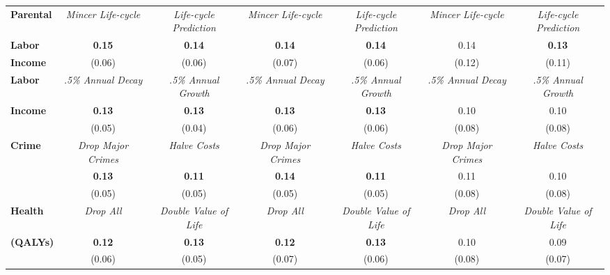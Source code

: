 \begin{tabular}{>{\bfseries}lcc|cc|cc}
Parental	&	\textit{Mincer Life-cycle}	&	\textit{Life-cycle Prediction}	&	\textit{Mincer Life-cycle}	&	\textit{Life-cycle Prediction}	&	\textit{Mincer Life-cycle}	&	\textit{Life-cycle Prediction}	\\
Labor	&	\textbf{0.15}	&	\textbf{0.14}	&	\textbf{0.14}	&	\textbf{0.14}	&	0.14	&	\textbf{0.13}	\\
Income	&	(0.06)	&	(0.06)	&	(0.07)	&	(0.06)	&	(0.12)	&	(0.11)	\\ \midrule
Labor	&	\textit{.5\% Annual Decay}	&	\textit{.5\% Annual Growth}	&	\textit{.5\% Annual Decay}	&	\textit{.5\% Annual Growth}	&	\textit{.5\% Annual Decay}	&	\textit{.5\% Annual Growth}	\\
Income	&	\textbf{0.13}	&	\textbf{0.13}	&	\textbf{0.13}	&	\textbf{0.13}	&	0.10	&	0.10	\\
	&	(0.05)	&	(0.04)	&	(0.06)	&	(0.06)	&	(0.08)	&	(0.08)	\\ \midrule
Crime	&	\textit{Drop Major Crimes}	&	\textit{Halve Costs}	&	\textit{Drop Major Crimes}	&	\textit{Halve Costs}	&	\textit{Drop Major Crimes}	&	\textit{Halve Costs}	\\
	&	\textbf{0.13}	&	\textbf{0.11}	&	\textbf{0.14}	&	\textbf{0.11}	&	0.11	&	0.10	\\
	&	(0.05)	&	(0.05)	&	(0.05)	&	(0.05)	&	(0.08)	&	(0.08)	\\ \midrule
Health	&	\textit{Drop All}	&	\textit{Double Value of Life}	&	\textit{Drop All}	&	\textit{Double Value of Life}	&	\textit{Drop All}	&	\textit{Double Value of Life}	\\
(QALYs)	&	\textbf{0.12}	&	\textbf{0.13}	&	\textbf{0.12}	&	\textbf{0.13}	&	0.10	&	0.09	\\
	&	(0.06)	&	(0.05)	&	(0.07)	&	(0.06)	&	(0.08)	&	(0.07)	\\ \bottomrule
\end{tabular} 